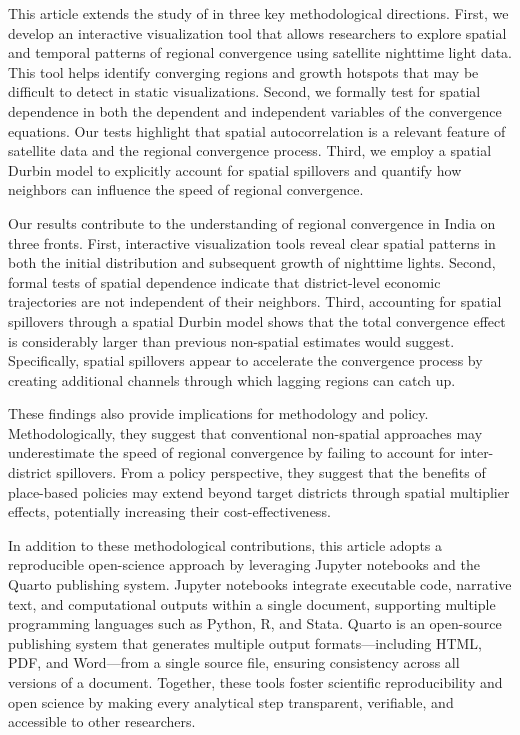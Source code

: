 \documentclass[
  a4paper, 
  twoside,
  review
]{article}
\newcounter{code}
\begin{document}
This article extends the study of
\citet{chanda_kabiraj_district_convergence} in three key methodological
directions. First, we develop an interactive visualization tool that
allows researchers to explore spatial and temporal patterns of regional
convergence using satellite nighttime light data. This tool helps
identify converging regions and growth hotspots that may be difficult to
detect in static visualizations. Second, we formally test for spatial
dependence in both the dependent and independent variables of the
convergence equations. Our tests highlight that spatial autocorrelation
is a relevant feature of satellite data and the regional convergence
process. Third, we employ a spatial Durbin model to explicitly account
for spatial spillovers and quantify how neighbors can influence the
speed of regional convergence.

Our results contribute to the understanding of regional convergence in
India on three fronts. First, interactive visualization tools reveal
clear spatial patterns in both the initial distribution and subsequent
growth of nighttime lights. Second, formal tests of spatial dependence
indicate that district-level economic trajectories are not independent
of their neighbors. Third, accounting for spatial spillovers through a
spatial Durbin model shows that the total convergence effect is
considerably larger than previous non-spatial estimates would suggest.
Specifically, spatial spillovers appear to accelerate the convergence
process by creating additional channels through which lagging regions
can catch up.

These findings also provide implications for methodology and policy.
Methodologically, they suggest that conventional non-spatial approaches
may underestimate the speed of regional convergence by failing to
account for inter-district spillovers. From a policy perspective, they
suggest that the benefits of place-based policies may extend beyond
target districts through spatial multiplier effects, potentially
increasing their cost-effectiveness.

In addition to these methodological contributions, this article adopts a
reproducible open-science approach by leveraging Jupyter notebooks and
the Quarto publishing system. Jupyter notebooks integrate executable
code, narrative text, and computational outputs within a single
document, supporting multiple programming languages such as Python, R,
and Stata. Quarto is an open-source publishing system that generates
multiple output formats---including HTML, PDF, and Word---from a single
source file, ensuring consistency across all versions of a document.
Together, these tools foster scientific reproducibility and open science
by making every analytical step transparent, verifiable, and accessible
to other researchers.
\end{document}
